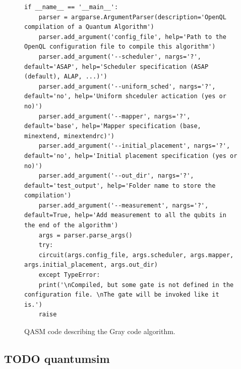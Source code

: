 \begin{itemize}
\begin{figure}
\begin{minipage}{.45\textwidth}
\begin{verbatim}
if __name__ == '__main__':
    parser = argparse.ArgumentParser(description='OpenQL compilation of a Quantum Algorithm')
    parser.add_argument('config_file', help='Path to the OpenQL configuration file to compile this algorithm')
    parser.add_argument('--scheduler', nargs='?', default='ASAP', help='Scheduler specification (ASAP (default), ALAP, ...)')
    parser.add_argument('--uniform_sched', nargs='?', default='no', help='Uniform shceduler actication (yes or no)')
    parser.add_argument('--mapper', nargs='?', default='base', help='Mapper specification (base, minextend, minextendrc)')
    parser.add_argument('--initial_placement', nargs='?', default='no', help='Initial placement specification (yes or no)')
    parser.add_argument('--out_dir', nargs='?', default='test_output', help='Folder name to store the compilation')
    parser.add_argument('--measurement', nargs='?', default=True, help='Add measurement to all the qubits in the end of the algorithm')
    args = parser.parse_args()
    try:
	circuit(args.config_file, args.scheduler, args.mapper, args.initial_placement, args.out_dir)
    except TypeError:
	print('\nCompiled, but some gate is not defined in the configuration file. \nThe gate will be invoked like it is.')
	raise

\end{verbatim}

\caption{QASM code describing the Gray code algorithm.}
\label{code:qasm_gray_code}
\end{minipage}
\end{figure}
\end{itemize}

\subsection*{{\bfseries\sffamily TODO} quantumsim}
\label{sec:orge03196d}

